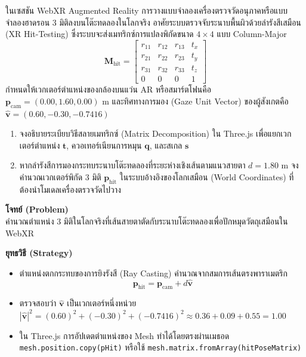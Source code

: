 \begin{psctexample}
ในเซสชัน WebXR Augmented Reality การวางแบบจำลองเครื่องตรวจวัดอนุภาคหรือแบบจำลองฮาดรอน 3 มิติลงบนโต๊ะทดลองในโลกจริง อาศัยระบบตรวจจับระนาบพื้นผิวด้วยลำรังสีเสมือน (XR Hit-Testing) ซึ่งระบบจะส่งเมทริกซ์การแปลงพิกัดขนาด $4 \times 4$ แบบ Column-Major
\begin{equation}
\mathbf{M}_{\text{hit}} = \begin{bmatrix}
r_{11} & r_{12} & r_{13} & t_x \\
r_{21} & r_{22} & r_{23} & t_y \\
r_{31} & r_{32} & r_{33} & t_z \\
0 & 0 & 0 & 1
\end{bmatrix}
\end{equation}
กำหนดให้เวกเตอร์ตำแหน่งของกล้องบนแว่น AR หรือสมาร์ตโฟนคือ $\mathbf{p}_{\text{cam}} = (0.00, 1.60, 0.00)\text{ m}$ และทิศทางการมอง (Gaze Unit Vector) ของผู้สังเกตคือ $\hat{\mathbf{v}} = (0.60, -0.30, -0.7416)$
\begin{enumerate}
    \item จงอธิบายระเบียบวิธีสลายเมทริกซ์ (Matrix Decomposition) ใน Three.js เพื่อแยกเวกเตอร์ตำแหน่ง $\mathbf{t}$, ควอเทอร์เนียนการหมุน $\mathbf{q}$, และสเกล $\mathbf{s}$
    \item หากลำรังสีการมองกระทบระนาบโต๊ะทดลองที่ระยะห่างเชิงเส้นตามแนวสายตา $d = 1.80\text{ m}$ จงคำนวณเวกเตอร์พิกัด 3 มิติ $\mathbf{p}_{\text{hit}}$ ในระบบอ้างอิงของโลกเสมือน (World Coordinates) ที่ต้องนำโมเดลเครื่องตรวจวัดไปวาง
\end{enumerate}

\textbf{โจทย์ (Problem)} \\
คำนวณตำแหน่ง 3 มิติในโลกจริงที่เส้นสายตาตัดกับระนาบโต๊ะทดลองเพื่อปักหมุดวัตถุเสมือนใน WebXR

\textbf{ยุทธวิธี (Strategy)} \\
\begin{itemize}
    \item ตำแหน่งตกกระทบของการยิงรังสี (Ray Casting) คำนวณจากสมการเส้นตรงพาราเมตริก
    \begin{equation}
    \mathbf{p}_{\text{hit}} = \mathbf{p}_{\text{cam}} + d \hat{\mathbf{v}}
    \end{equation}
    \item ตรวจสอบว่า $\hat{\mathbf{v}}$ เป็นเวกเตอร์หนึ่งหน่วย $|\hat{\mathbf{v}}|^2 = (0.60)^2 + (-0.30)^2 + (-0.7416)^2 \approx 0.36 + 0.09 + 0.55 = 1.00$
    \item ใน Three.js การอัปเดตตำแหน่งของ Mesh ทำได้โดยตรงผ่านเมธอด \texttt{mesh.position.copy(pHit)} หรือใช้ \texttt{mesh.matrix.fromArray(hitPoseMatrix)}
\end{itemize}


\end{psctexample}
